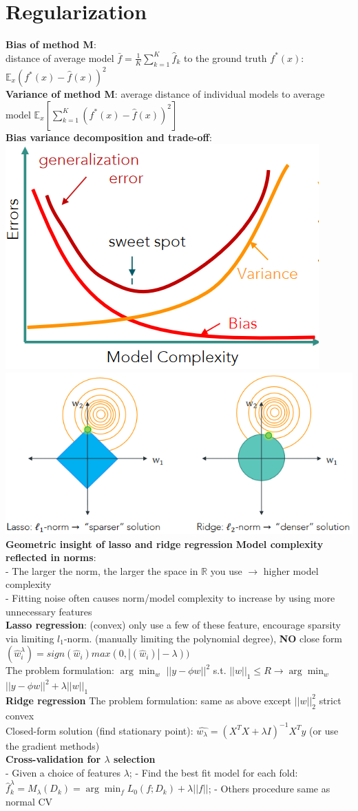 
 \section{Regularization}
\textbf{Bias of method M}: \\
distance of average model $\bar{f} = \frac{1}{K}\sum_{k=1}^{K}\hat{f}_k$ to the ground truth $f^{*}(x)$: $\mathbb{E}_{x}(f^{*}(x)-\hat{f}(x))^2$ \\
\textbf{Variance of method M}:
average distance of individual models to average model $\mathbb{E}_{x}[\sum_{k=1}^{K}(f^{*}(x)-\hat{f}(x))^2]$ \\
\textbf{Bias variance decomposition and trade-off}: \\
\includegraphics[width=0.35\linewidth]{pics/figure3.PNG} 
\includegraphics[width=0.6\linewidth]{pics/figure4.PNG}\\
\textbf{Geometric insight of lasso and ridge regression}
\textbf{Model complexity reflected in norms}: \\
- The larger the norm, the larger the space in $\mathbb{R}$ you use $\rightarrow$ higher model complexity \\
- Fitting noise often causes norm/model complexity to increase by using more unnecessary features\\
\textbf{Lasso regression}: (convex)
only use a few of these feature, encourage sparsity via limiting $l_1$-norm. (manually limiting the polynomial degree), \textbf{NO} close form $(\hat{w}^{\lambda}_i) = sign(\hat{w}_i)max(0, |(\hat{w}_i)| - \lambda))$ \\
The problem formulation: $\arg \min_{w}$ $||y - \phi w||^2$ s.t. $||w||_1 \leq R \rightarrow \arg \min_{w}$ $||y - \phi w||^2 + \lambda ||w||_1$\\
\textbf{Ridge regression}
The problem formulation: same as above except $||w||_2^2$ \quad\quad strict convex\\ 

Closed-form solution (find stationary point): $\hat{w_{\lambda}} = (X^TX + \lambda I)^{-1}X^Ty$ (or use the gradient methods) \\

\textbf{Cross-validation for $\lambda$ selection}\\
- Given a choice of features $\lambda$; - Find the best fit model for each fold: $\hat{f}^{\lambda}_k = M_{\lambda}(D_k) = \arg \min_{f} L_0(f;D_k) + \lambda ||f||$; - Others procedure same as normal CV
